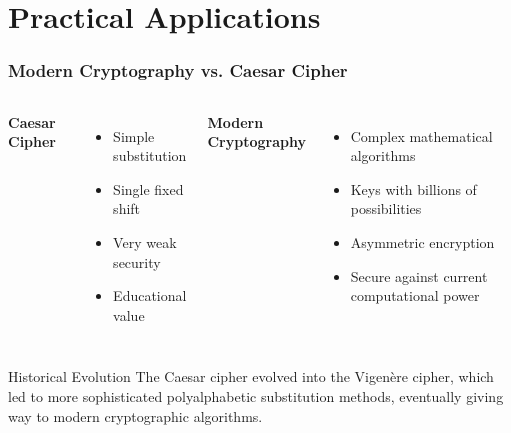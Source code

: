 \documentclass{beamer}
\begin{document}
\section{Practical Applications}

\begin{frame}
    \frametitle{Modern Cryptography vs. Caesar Cipher}
    
    \begin{columns}
    \textbf{Caesar Cipher}
    \begin{itemize}
        \item Simple substitution
        \item Single fixed shift
        \item Very weak security
        \item Educational value
    \end{itemize}
    
    \textbf{Modern Cryptography}
    \begin{itemize}
        \item Complex mathematical algorithms
        \item Keys with billions of possibilities
        \item Asymmetric encryption
        \item Secure against current computational power
    \end{itemize}
    \end{columns}
    
    \begin{alertblock}{Historical Evolution}
        The Caesar cipher evolved into the Vigenère cipher, which led to more sophisticated polyalphabetic substitution methods, eventually giving way to modern cryptographic algorithms.
    \end{alertblock}
\end{frame}
\end{document}
